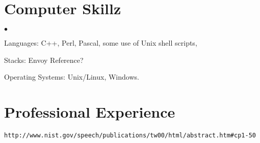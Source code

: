 \documentclass[margin,line]{res}
\newenvironment{list2}{
  \begin{list}{$\bullet$}{
      \setlength{\itemsep}{0in}
      \setlength{\parsep}{0in} \setlength{\parskip}{0in}
      \setlength{\topsep}{0in} \setlength{\partopsep}{0in} 
      \setlength{\leftmargin}{0.2in}}}{\end{list}}
\begin{document}
\begin{resume}
\section{\sc Computer Skillz} 
\begin{list2}
\item Languages:  C++, Perl, Pascal, some use of Unix shell scripts,
\item Stacks: Envoy Reference?
\item  
\item Operating Systems:  Unix/Linux, Windows.\\ 
\end{list2}

\section{\sc Professional Experience}

\begin{verbatim}http://www.nist.gov/speech/publications/tw00/html/abstract.htm#cp1-50\end{verbatim}
\end{resume}
\end{document}
